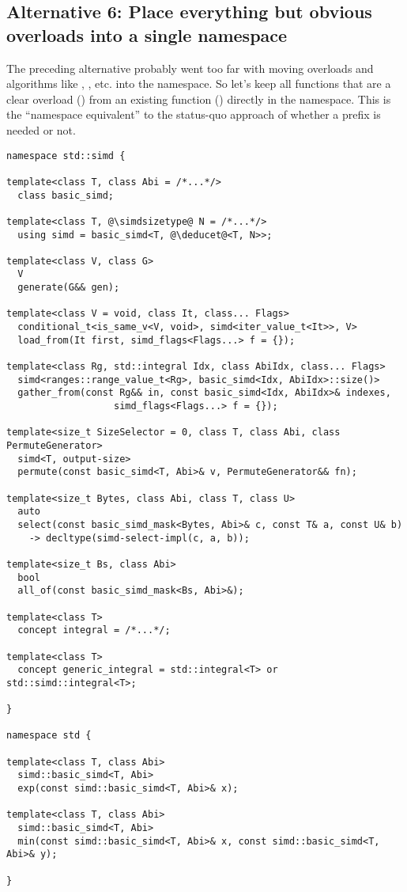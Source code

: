 \subsection{Alternative 6: Place everything but obvious overloads into a
single namespace}

The preceding alternative probably went too far with moving 
overloads and algorithms like , , etc. into the
\std{} namespace.
So let's keep all functions that are a clear overload () from
an existing function () directly in the  namespace.
This is the “namespace equivalent” to the status-quo approach of whether a
 prefix is needed or not.

\medskip\begin{lstlisting}[style=Vc]
namespace std::simd {

template<class T, class Abi = /*...*/>
  class basic_simd;

template<class T, @\simdsizetype@ N = /*...*/>
  using simd = basic_simd<T, @\deducet@<T, N>>;

template<class V, class G>
  V
  generate(G&& gen);

template<class V = void, class It, class... Flags>
  conditional_t<is_same_v<V, void>, simd<iter_value_t<It>>, V>
  load_from(It first, simd_flags<Flags...> f = {});

template<class Rg, std::integral Idx, class AbiIdx, class... Flags>
  simd<ranges::range_value_t<Rg>, basic_simd<Idx, AbiIdx>::size()>
  gather_from(const Rg&& in, const basic_simd<Idx, AbiIdx>& indexes,
                   simd_flags<Flags...> f = {});

template<size_t SizeSelector = 0, class T, class Abi, class PermuteGenerator>
  simd<T, output-size>
  permute(const basic_simd<T, Abi>& v, PermuteGenerator&& fn);

template<size_t Bytes, class Abi, class T, class U>
  auto
  select(const basic_simd_mask<Bytes, Abi>& c, const T& a, const U& b)
    -> decltype(simd-select-impl(c, a, b));

template<size_t Bs, class Abi>
  bool
  all_of(const basic_simd_mask<Bs, Abi>&);

template<class T>
  concept integral = /*...*/;

template<class T>
  concept generic_integral = std::integral<T> or std::simd::integral<T>;

}

namespace std {

template<class T, class Abi>
  simd::basic_simd<T, Abi>
  exp(const simd::basic_simd<T, Abi>& x);

template<class T, class Abi>
  simd::basic_simd<T, Abi>
  min(const simd::basic_simd<T, Abi>& x, const simd::basic_simd<T, Abi>& y);

}
\end{lstlisting}

